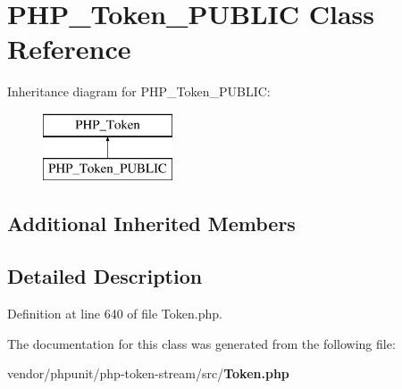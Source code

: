 \section{P\+H\+P\+\_\+\+Token\+\_\+\+P\+U\+B\+L\+I\+C Class Reference}
\label{class_p_h_p___token___p_u_b_l_i_c}
Inheritance diagram for P\+H\+P\+\_\+\+Token\+\_\+\+P\+U\+B\+L\+I\+C\+:\begin{figure}[H]
\begin{center}
\leavevmode
\includegraphics[height=2.000000cm]{class_p_h_p___token___p_u_b_l_i_c}
\end{center}
\end{figure}
\subsection*{Additional Inherited Members}


\subsection{Detailed Description}


Definition at line 640 of file Token.\+php.



The documentation for this class was generated from the following file\+:\begin{DoxyCompactItemize}
\item 
vendor/phpunit/php-\/token-\/stream/src/{\bf Token.\+php}\end{DoxyCompactItemize}
